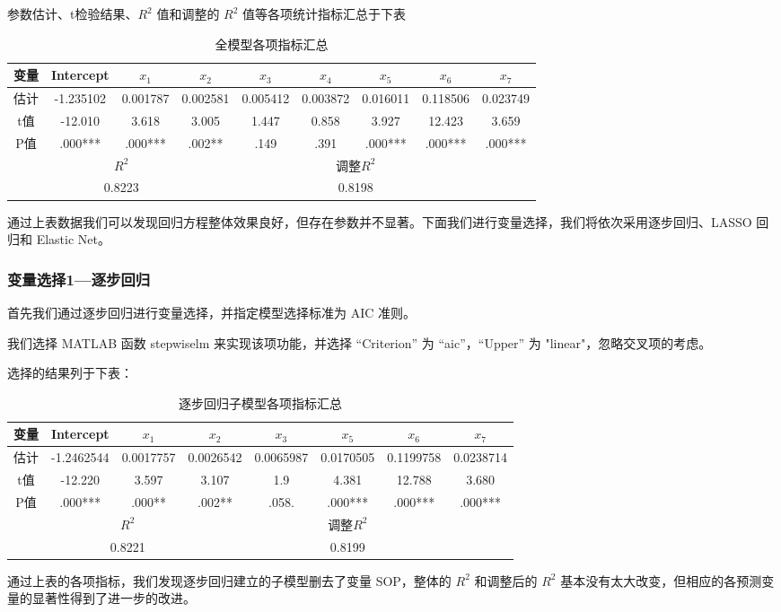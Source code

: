 \documentclass[11pt]{article}
\begin{document}
参数估计、t检验结果、$R^2$ 值和调整的 $R^2$ 值等各项统计指标汇总于下表
\begin{table}[H]
	\centering
	\caption{全模型各项指标汇总}
	\begin{tabular}{ccccccccc}
		\hline\hline
		    变量& Intercept& $x_1$    & $x_2$    & $x_3$   & $x_4$    & $x_5$    & $x_6$    & $x_7$  \\
		    \hline
	估计	&  -1.235102   &  0.001787   & 0.002581   &  0.005412   & 0.003872    &  0.016011   & 0.118506    &0.023749 \\
		t值& -12.010    &   3.618  & 3.005   & 1.447     &  0.858   & 3.927    &  12.423  &3.659 \\
		P值&  .000***   &.000***     &.002**    & .149    &.391     & .000***    &.000***   &.000*** \\
		\hline\hline
\multicolumn{4}{c}{$R^2$} & \multicolumn{4}{c}{调整$R^2$}& \\
\hline
		\multicolumn{4}{c}{0.8223}& \multicolumn{4}{c}{0.8198 
		}&\\
		\hline\hline
	\end{tabular}
\end{table}
通过上表数据我们可以发现回归方程整体效果良好，但存在参数并不显著。下面我们进行变量选择，我们将依次采用逐步回归、LASSO 回归和 Elastic Net。
\subsubsection*{变量选择1---逐步回归}
首先我们通过逐步回归进行变量选择，并指定模型选择标准为 AIC 准则。

我们选择 MATLAB 函数 stepwiselm 来实现该项功能，并选择 “Criterion” 为 “aic”，“Upper” 为 "linear"，忽略交叉项的考虑。

选择的结果列于下表：
\begin{table}[H]
	\centering
	\caption{逐步回归子模型各项指标汇总}
	\label{tab4}
	\begin{tabular}{cccccccc}
		\hline\hline
		变量& Intercept& $x_1$    & $x_2$    & $x_3$   &   $x_5$    & $x_6$    & $x_7$ \\
		\hline
		估计	& -1.2462544    & 0.0017757   & 0.0026542   & 0.0065987    & 0.0170505   & 0.1199758    &  0.0238714  \\
		t值& -12.220     &    3.597  & 3.107   & 1.9    &  4.381   & 12.788     &  3.680    \\
		P值&  .000***
		&.000**   &.002**     &.058.    & .000***   &.000***     & .000***   \\
		\hline\hline
		\multicolumn{4}{c}{$R^2$} & \multicolumn{3}{c}{调整$R^2$}& \\
		\hline
		\multicolumn{4}{c}{ 0.8221}& \multicolumn{3}{c}{0.8199}&\\
		\hline\hline
	\end{tabular}
\end{table}
通过上表的各项指标，我们发现逐步回归建立的子模型删去了变量 SOP，整体的 $R^2$ 和调整后的 $R^2$ 基本没有太大改变，但相应的各预测变量的显著性得到了进一步的改进。
\end{document}

